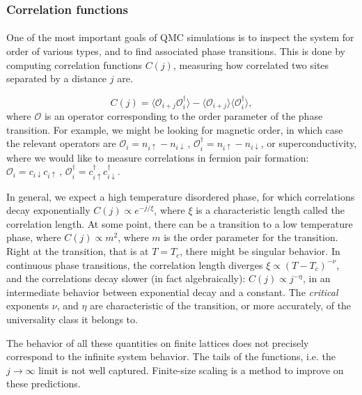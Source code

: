 \documentclass[10pt, twocolumn, twoside]{article}
\begin{document}
\subsubsection{Correlation functions}\paragraph{}

One of the most important goals of QMC simulations is to inspect the system for order of various types, and to find  associated phase transitions. This is done by computing correlation functions $C (j) $, measuring how correlated two sites separated by a distance $j$ are.

\begin{equation}
C(j) = \big\langle \mathcal{O}_{i+j} \mathcal{O}_{i}^\dagger \big\rangle - \langle \mathcal{O}_{i+j} \big\rangle\big\langle\mathcal{O}_{i}^\dagger \big\rangle ,
\end{equation}
where $\mathcal{O}$ is an operator corresponding to the order parameter of the phase transition. For example, we might be looking for magnetic order, in which case the relevant operators are $\mathcal{O}_i = n_{i\uparrow} - n_{i\downarrow} \, , \, \mathcal{O}_i^\dagger = n_{i\uparrow} - n_{i\downarrow}$, or superconductivity, where we would like to measure correlations in fermion pair formation: $\mathcal{O}_i = c_{i\downarrow} c_{i\uparrow} \, , \, \mathcal{O}_i^\dagger = c_{i\uparrow}^\dagger c_{i\downarrow}^\dagger$.

In general, we expect a high temperature disordered phase, for which correlations decay exponentially $C(j) \propto e^{-j/\xi}$, where $\xi$ is a characteristic length called the correlation length. At some point, there can be a transition to a low temperature phase, where $C(j) \propto m^2$, where $m$ is the order parameter for the transition. Right at the transition, that is at $T = T_c$, there might be singular behavior. In continuous phase transitions, the correlation length diverges $\xi \propto (T-T_c)^{-\nu}$, and the correlations decay slower (in fact algebraically): $C(j) \propto j^{-\eta}$, in an intermediate behavior between exponential decay and a constant. The \emph{critical} exponents $\nu$, and $\eta$ are characteristic of the transition, or more accurately, of the universality class it belongs to.

The behavior of all these quantities on finite lattices does not precisely correspond to the infinite system behavior. The tails of the functions, i.e. the $j\rightarrow \infty$ limit is not well captured. Finite-size scaling is a method to improve on these predictions.
\end{document}
